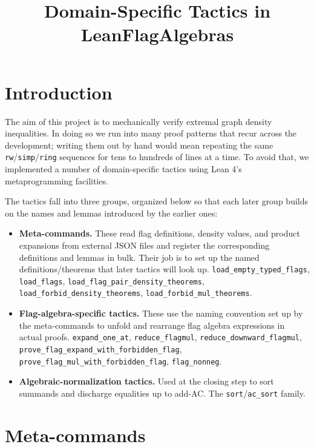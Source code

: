 \documentclass[11pt]{article}
\title{Domain-Specific Tactics in LeanFlagAlgebras}
\author{}
\date{}
\begin{document}
\maketitle

\section{Introduction}

The aim of this project is to mechanically verify extremal graph density
inequalities. In doing so we run into many proof patterns that recur
across the development; writing them out by hand would mean repeating
the same \texttt{rw}/\texttt{simp}/\texttt{ring} sequences for tens to
hundreds of lines at a time. To avoid that, we implemented a number of
domain-specific tactics using Lean 4's metaprogramming facilities.

\bigskip\noindent
The tactics fall into three groups, organized below so that each later
group builds on the names and lemmas introduced by the earlier ones:

\begin{itemize}
  \item \textbf{Meta-commands.} These read flag definitions, density
    values, and product expansions from external JSON files and
    register the corresponding definitions and lemmas in bulk. Their
    job is to set up the named definitions/theorems that later tactics
    will look up.
    \texttt{load\_empty\_typed\_flags},
    \texttt{load\_flags},
    \texttt{load\_flag\_pair\_density\_theorems},
    \texttt{load\_forbid\_density\_theorems},
    \texttt{load\_forbid\_mul\_theorems}.
  \item \textbf{Flag-algebra-specific tactics.} These use the naming
    convention set up by the meta-commands to unfold and rearrange
    flag algebra expressions in actual proofs.
    \texttt{expand\_one\_at},
    \texttt{reduce\_flagmul},
    \texttt{reduce\_downward\_flagmul},
    \texttt{prove\_flag\_expand\_with\_forbidden\_flag},
    \texttt{prove\_flag\_mul\_with\_forbidden\_flag},
    \texttt{flag\_nonneg}.
  \item \textbf{Algebraic-normalization tactics.} Used at the closing
    step to sort summands and discharge equalities up to add-AC.
    The \texttt{sort}/\texttt{ac\_sort} family.
\end{itemize}

\section{Meta-commands}
\end{document}
